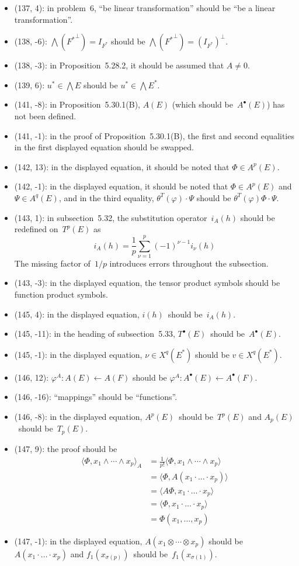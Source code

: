 \documentclass[letterpaper,12pt]{article}
\newcommand{\from}{\leftarrow}
\newcommand{\tprod}{\otimes}
\newcommand{\eprod}{\wedge}
\newcommand{\bigeprod}{\bigwedge}
\newcommand{\sprod}[2]{\langle#1,#2\rangle}
\newcommand{\oc}[1]{#1^{\perp}}
\begin{document}
\begin{itemize}
\item (137, 4): in problem~6, ``be linear transformation'' should be ``be a linear transformation''.
\item (138, -6): \(\bigeprod(\oc{{F^*}})=I_{F^*}\) should be \(\bigeprod(\oc{{F^*}})=\oc{(I_{F^*})}\).
\item (138, -3): in Proposition~5.28.2, it should be assumed that \(A\ne 0\).
\item (139, 6): \(u^*\in\bigeprod E\) should be \(u^*\in\bigeprod E^*\).
\item (141, -8): in Proposition~5.30.1(B), \(A(E)\) (which should be~\(A^{\bullet}(E)\)) has not been defined.
\item (141, -1): in the proof of Proposition~5.30.1(B), the first and second equalities in the first displayed equation should be swapped.
\item (142, 13): in the displayed equation, it should be noted that \(\Phi\in A^p(E)\).
\item (142, -1): in the displayed equation, it should be noted that \(\Phi\in A^p(E)\) and \(\Psi\in A^q(E)\), and in the third equality, \(\theta^T(\varphi)\cdot\Psi\) should be \(\theta^T(\varphi)\Phi\cdot\Psi\).
\item (143, 1): in subsection~5.32, the substitution operator~\(i_A(h)\) should be redefined on~\(T^p(E)\) as
\[i_A(h)=\frac{1}{p}\sum_{\nu=1}^p(-1)^{\nu-1}i_{\nu}(h)\]
The missing factor of~\(1/p\) introduces errors throughout the subsection.
\item (143, -3): in the displayed equation, the tensor product symbols should be function product symbols.
\item (145, 4): in the displayed equation, \(i(h)\)~should be~\(i_A(h)\).
\item (145, -11): in the heading of subsection~5.33, \(T^{\bullet}(E)\)~should be~\(A^{\bullet}(E)\).
\item (145, -1): in the displayed equation, \(\nu\in X^q(E^*)\) should be \(v\in X^q(E^*)\).
\item (146, 12): \(\varphi^A:A(E)\from A(F)\) should be \(\varphi^A:A^{\bullet}(E)\from A^{\bullet}(F)\).
\item (146, -16): ``mappings'' should be ``functions''.
\item (146, -8): in the displayed equation, \(A^p(E)\)~should be~\(T^p(E)\) and \(A_p(E)\)~should be~\(T_p(E)\).
\item (147, 9): the proof should be
\begin{align*}
\sprod{\Phi}{x_1\eprod\cdots\eprod x_p}_A&=\frac{1}{p!}\sprod{\Phi}{x_1\eprod\cdots\eprod x_p}\\
	&=\sprod{\Phi}{A(x_1\cdot\ldots\cdot x_p)}\\
	&=\sprod{A\Phi}{x_1\cdot\ldots\cdot x_p}\\
	&=\sprod{\Phi}{x_1\cdot\ldots\cdot x_p}\\
	&=\Phi(x_1,\ldots,x_p)
\end{align*}
\item (147, -1): in the displayed equation, \(A(x_1\tprod\cdots\tprod x_p)\) should be \(A(x_1\cdot\ldots\cdot x_p)\) and \(f_1(x_{\sigma(p)})\)~should be~\(f_1(x_{\sigma(1)})\).
\end{itemize}
\end{document}

